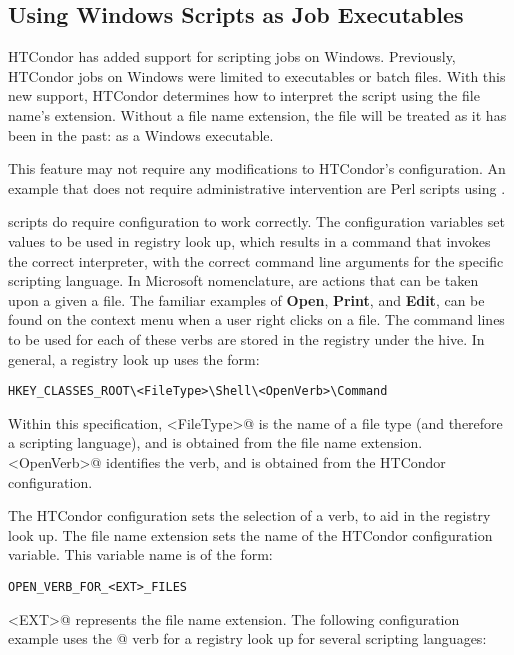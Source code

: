 \subsection{\label{sec:windows-scripts-as-executables}Using Windows Scripts as Job Executables}

HTCondor has added support for scripting jobs on Windows.
Previously, HTCondor jobs on Windows were limited to executables or batch files.
With this new support,
HTCondor determines how to interpret the script using 
the file name's extension.
Without a file name extension, 
the file will be treated as it has been in the past:
as a Windows executable.

This feature may not require any modifications to HTCondor's configuration.  
An example that does not require administrative intervention
are Perl scripts using .

 scripts do require
configuration to work correctly.
The configuration variables set values to be used in registry look up,
which results in a command that invokes the correct interpreter,
with the correct command line arguments for the specific scripting
language.
In Microsoft nomenclature, 
 are actions that can be taken upon a given a file.
The familiar examples of
\textbf{Open}, \textbf{Print}, and \textbf{Edit},
can be found on the context menu when a user right clicks on a file.
The command lines to be used for each of these verbs are stored in
the registry under the  hive.
In general, a registry look up uses the form:

\footnotesize
\begin{verbatim}
HKEY_CLASSES_ROOT\<FileType>\Shell\<OpenVerb>\Command
\end{verbatim}
\normalsize

Within this specification, 
\verb@<FileType>@ is the name of a file type
(and therefore a scripting language),
and is obtained from the file name extension.
\verb@<OpenVerb>@ identifies the verb,
and is obtained from the HTCondor configuration.

The HTCondor configuration sets the selection of a verb,
to aid in the registry look up.
The file name extension sets the name of the HTCondor configuration variable.
This variable name is of the form:
\begin{verbatim}
OPEN_VERB_FOR_<EXT>_FILES
\end{verbatim}
\verb@<EXT>@ represents the file name extension.
The following configuration example uses the @ verb for
a  registry look up for several scripting
languages:

